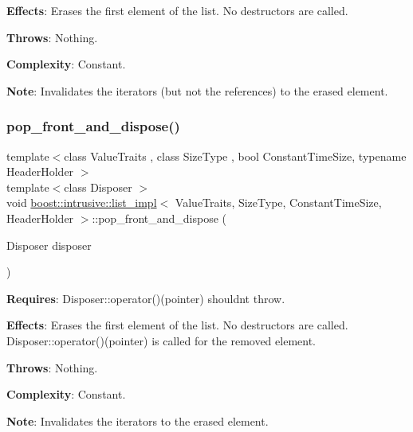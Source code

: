 {\bfseries Effects}\+: Erases the first element of the list. No destructors are called.

{\bfseries Throws}\+: Nothing.

{\bfseries Complexity}\+: Constant.

{\bfseries Note}\+: Invalidates the iterators (but not the references) to the erased element. \mbox{\label{classboost_1_1intrusive_1_1list__impl_ab1d06a67a6e0f958b0f3afd61d2af8d5}} 
\subsubsection{\texorpdfstring{pop\+\_\+front\+\_\+and\+\_\+dispose()}{pop\_front\_and\_dispose()}}
{\footnotesize\ttfamily template$<$class Value\+Traits , class Size\+Type , bool Constant\+Time\+Size, typename Header\+Holder $>$ \\
template$<$class Disposer $>$ \\
void \hyperlink{classboost_1_1intrusive_1_1list__impl}{boost\+::intrusive\+::list\+\_\+impl}$<$ Value\+Traits, Size\+Type, Constant\+Time\+Size, Header\+Holder $>$\+::pop\+\_\+front\+\_\+and\+\_\+dispose (\begin{DoxyParamCaption}\item[{Disposer}]{disposer }\end{DoxyParamCaption})\hspace{0.3cm}{\ttfamily [inline]}}

{\bfseries Requires}\+: Disposer\+::operator()(pointer) shouldn\textquotesingle{}t throw.

{\bfseries Effects}\+: Erases the first element of the list. No destructors are called. Disposer\+::operator()(pointer) is called for the removed element.

{\bfseries Throws}\+: Nothing.

{\bfseries Complexity}\+: Constant.

{\bfseries Note}\+: Invalidates the iterators to the erased element. \mbox{\label{classboost_1_1intrusive_1_1list__impl_a486bb7078d16bbe0e569dbd8a16ef104}} 
